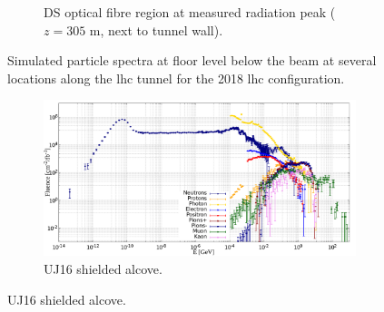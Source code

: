 \documentclass[encoding=utf8,british]{tumphthesis}
\begin{document}
\begin{figure}[H]
\begin{subfigure}{0.69\textwidth}
  \caption{DS optical fibre region at measured radiation peak ($z=305$ m, next to tunnel wall).}
  \label{fig:LHC-particle-distributions-DS-OF}
\end{subfigure}
\caption{Simulated particle spectra at floor level below the beam at several locations along the \acrshort{lhc} tunnel for the 2018 \acrshort{lhc} configuration.}
\label{fig:LHC-particle-distributions-DS}
\end{figure}


\begin{figure}
    \centering
\begin{subfigure}{0.65\textwidth}
    \centering
  \includegraphics[width=\linewidth]{results/particle_spectra_location_UJ16.png}
  \caption{UJ16 shielded alcove.}
  \label{fig:LHC-particle-distributions-UJ16}
\end{subfigure}
\end{figure}
\end{document}
